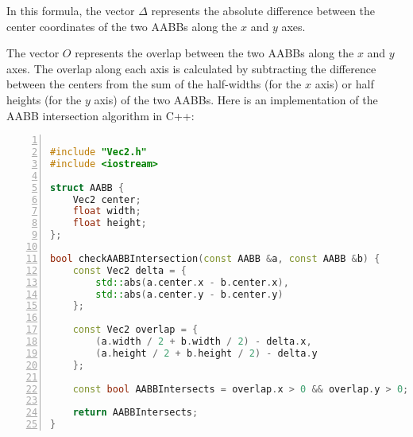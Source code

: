 In this formula, the vector $\Delta$ represents the absolute difference between
the center coordinates of the two AABBs along the $x$ and $y$ axes.

The vector $O$ represents the overlap between the two AABBs along the $x$ and
$y$ axes. The overlap along each axis is calculated by subtracting the
difference between the centers from the sum of the half-widths (for the $x$
axis) or half heights (for the $y$ axis) of the two AABBs. Here is an
implementation of the AABB intersection algorithm in C++:

\begin{mdframed}[linecolor=black!30!white,linewidth=.5pt,extratopheight=1em]
    \begin{lstlisting}[language=C++, aboveskip=3mm,
        belowskip=3mm,
        showstringspaces=false,
        columns=flexible,
        basicstyle={\small\ttfamily},
        numbers=left,
        numberstyle=\tiny\color{gray},
        keywordstyle=\color{blue},
        commentstyle=\color{dkgreen},
        stringstyle=\color{mauve},
        breaklines=true,
        breakatwhitespace=true,
        tabsize=3,
        xleftmargin=1em]

#include "Vec2.h"
#include <iostream>

struct AABB {
    Vec2 center;
    float width;
    float height;
};

bool checkAABBIntersection(const AABB &a, const AABB &b) {
    const Vec2 delta = {
        std::abs(a.center.x - b.center.x), 
        std::abs(a.center.y - b.center.y)
    };

    const Vec2 overlap = {
        (a.width / 2 + b.width / 2) - delta.x,
        (a.height / 2 + b.height / 2) - delta.y
    };
    
    const bool AABBIntersects = overlap.x > 0 && overlap.y > 0;

    return AABBIntersects;
}

\end{lstlisting}
\end{mdframed}




\newpage
